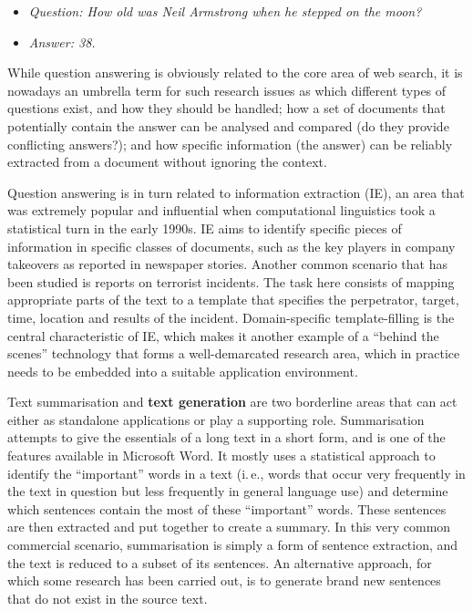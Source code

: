\begin{multicols}{2}
\begin{itemize}
\item[] \textit{Question: How old was Neil Armstrong when he stepped on the moon?}
\item[] \textit{Answer: 38.}
\end{itemize}

While question answering is obviously related to the core area of web search, it is nowadays an umbrella term for such research issues as which different types of questions exist, and how they should be handled; how a set of documents that potentially contain the answer can be analysed and compared (do they provide conflicting answers?); and how specific information (the answer) can be reliably extracted from a document without ignoring the context. 



Question answering is in turn related to information extraction (IE), an area that was extremely popular and influential when computational linguistics took a statistical turn in the early 1990s. IE aims to identify specific pieces of information in specific classes of documents, such as the key players in company takeovers as reported in newspaper stories. Another common scenario that has been studied is reports on terrorist incidents. The task here consists of mapping appropriate parts of the text to a template that specifies the perpetrator, target, time, location and results of the incident. Domain-specific template-filling is the central characteristic of IE, which makes it another example of a “behind the scenes” technology that forms a well-demarcated research area, which in practice needs to be embedded into a suitable application environment. 

    Text summarisation and \textbf{text generation} are two borderline areas that can act either as standalone applications or play a supporting role. Summarisation attempts to give the essentials of a long text in a short form, and is one of the features available in Microsoft Word. It mostly uses a statistical approach to identify the “important” words in a text (i.\,e., words that occur very frequently in the text in question but less frequently in general language use) and determine which sentences contain the most of these “important” words. These sentences are then extracted and put together to create a summary. In this very common commercial scenario, summarisation is simply a form of sentence extraction, and the text is reduced to a subset of its sentences. An alternative approach, for which some research has been carried out, is to generate brand new sentences that do not exist in the source text. 


\end{multicols}
